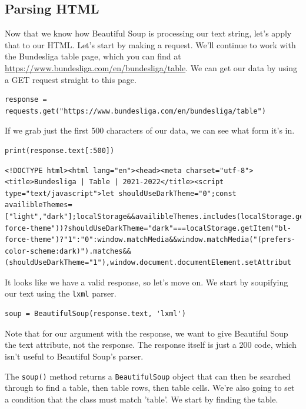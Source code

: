 \subsection{Parsing HTML}
Now that we know how Beautiful Soup is processing our text string, let's apply that to our HTML.
Let's start by making a request. We'll continue to work with the Bundesliga table page, which you can find at \\\href{https://www.bundesliga.com/en/bundesliga/table}{https://www.bundesliga.com/en/bundesliga/table}. We can get our data by using a GET request straight to this page.\par
\begin{lstlisting}[style=pippython]
response = requests.get("https://www.bundesliga.com/en/bundesliga/table")
\end{lstlisting}
If we grab just the first 500 characters of our data, we can see what form it's in.\par
\begin{lstlisting}[style=pippython]
print(response.text[:500])
\end{lstlisting}
\begin{lstlisting}[style=none]
<!DOCTYPE html><html lang="en"><head><meta charset="utf-8"><title>Bundesliga | Table | 2021-2022</title><script type="text/javascript">let shouldUseDarkTheme="0";const availibleThemes=["light","dark"];localStorage&&availibleThemes.includes(localStorage.getItem("bl-force-theme"))?shouldUseDarkTheme="dark"===localStorage.getItem("bl-force-theme")?"1":"0":window.matchMedia&&window.matchMedia("(prefers-color-scheme:dark)").matches&&(shouldUseDarkTheme="1"),window.document.documentElement.setAttribut
\end{lstlisting}
It looks like we have a valid response, so let's move on. We start by soupifying our text using the \verb|lxml| parser.\par
\begin{lstlisting}[style=pippython]
soup = BeautifulSoup(response.text, 'lxml')
\end{lstlisting}
Note that for our argument with the response, we want to give Beautiful Soup the text attribute, not the response. The response itself is just a 200 code, which isn't useful to Beautiful Soup's parser.\par
The \verb|soup()| method returns a \verb|BeautifulSoup| object that can then be searched through to find a table, then table rows, then table cells. We're also going to set a condition that the class must match 'table'. We start by finding the table.\par
